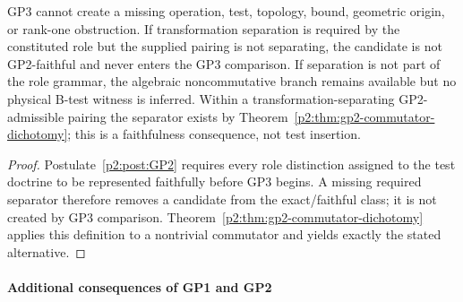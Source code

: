 \documentclass[12pt,a4paper]{article}
\begin{document}
\begin{corollary}
\label{p2:cor:gp3-no-generation-alone}
GP3 cannot create a missing operation, test, topology, bound, geometric
origin, or rank-one obstruction.  If transformation separation is required by
the constituted role but the supplied pairing is not separating, the candidate
is not GP2-faithful and never enters the GP3 comparison.  If separation is not
part of the role grammar, the algebraic noncommutative branch remains available
but no physical B-test witness is inferred.  Within a transformation-separating
GP2-admissible pairing the separator exists by
Theorem~\ref{p2:thm:gp2-commutator-dichotomy}; this is a faithfulness
consequence, not test insertion.
\end{corollary}

\begin{proof}
Postulate~\ref{p2:post:GP2} requires every role distinction assigned to the
test doctrine to be represented faithfully before GP3 begins.  A missing
required separator therefore removes a candidate from the exact/faithful
class; it is not created by GP3 comparison.
Theorem~\ref{p2:thm:gp2-commutator-dichotomy} applies this definition to a
nontrivial commutator and yields exactly the stated alternative.
\end{proof}

\paragraph{Additional consequences of GP1 and GP2}
\end{document}
